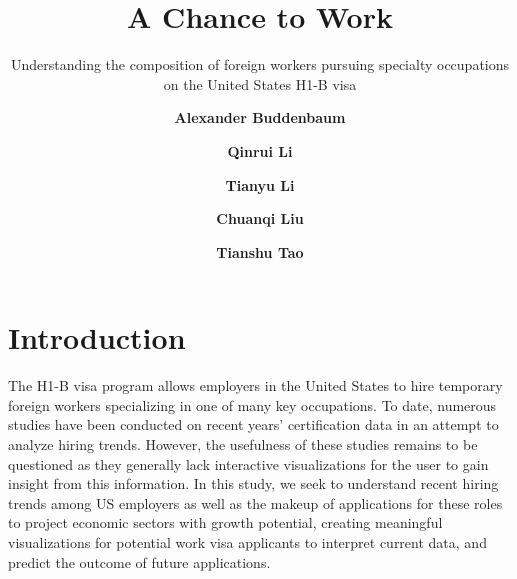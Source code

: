 \documentclass[sigconf]{acmart}
\begin{document}
\title{A Chance to Work}
\subtitle{Understanding the composition of foreign workers 
pursuing specialty occupations on the United States H1-B visa
}


\author{\textbf{Alexander Buddenbaum}}

\author{\textbf{Qinrui Li}}

\author{\textbf{Tianyu Li}}


\author{\textbf{Chuanqi Liu}}

\author{\textbf{Tianshu Tao}}



\maketitle

\section{Introduction}

The H1-B visa program allows employers in the United States to hire temporary foreign workers specializing in one of many key occupations.  
To date, numerous studies have been conducted on recent years’ certification data in an attempt to analyze hiring trends. 
However, the usefulness of these studies remains to be questioned as they generally lack interactive visualizations for the user to gain 
insight from this information. In this study, we seek to understand recent hiring trends among US employers as well as the makeup of 
applications for these roles to project economic sectors with growth potential, creating meaningful visualizations for potential work 
visa applicants to interpret current data, and predict the outcome of future applications.
\end{document}
